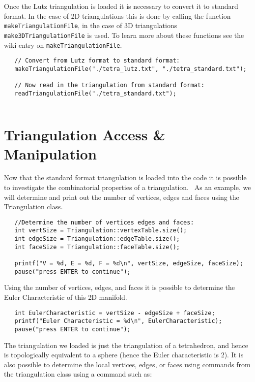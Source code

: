 \documentclass{amsart}
\theoremstyle{plain}
\numberwithin{equation}{section}
\begin{document}
Once the Lutz triangulation is loaded it is necessary to convert it to
standard format. In the case of 2D triangulations this is done by calling
the function \verb|makeTriangulationFile|, in the case of 3D triangulations 
\verb|make3DTriangulationFile| is used. To learn more about these
functions see the wiki entry on \verb|makeTriangulationFile|.\newline
\begin{verbatim}
   // Convert from Lutz format to standard format:
   makeTriangulationFile("./tetra_lutz.txt", "./tetra_standard.txt");
 
   // Now read in the triangulation from standard format:
   readTriangulationFile("./tetra_standard.txt");
 
\end{verbatim}

\section*{Triangulation Access \& Manipulation}

Now that the standard format triangulation is loaded into the code it is
possible to investigate the combinatorial properties of a triangulation. \
As an example, we will determine and print out the number of vertices, edges
and faces using the Triangulation class.\newline
\begin{verbatim}
   //Determine the number of vertices edges and faces:
   int vertSize = Triangulation::vertexTable.size();
   int edgeSize = Triangulation::edgeTable.size();
   int faceSize = Triangulation::faceTable.size();
 
   printf("V = %d, E = %d, F = %d\n", vertSize, edgeSize, faceSize);
   pause("press ENTER to continue");
\end{verbatim}

\bigskip

Using the number of vertices, edges, and faces it is possible to determine
the Euler Characteristic of this 2D manifold.\newline
\begin{verbatim}
   int EulerCharacteristic = vertSize - edgeSize + faceSize;
   printf("Euler Characteristic = %d\n", EulerCharacteristic);
   pause("press ENTER to continue");
\end{verbatim}

\bigskip

The triangulation we loaded is just the triangulation of a tetrahedron, and
hence is topologically equivalent to a sphere (hence the Euler
characteristic is 2). It is also possible to determine the local vertices,
edges, or faces using commands from the triangulation class using a command
such as:
\end{document}
